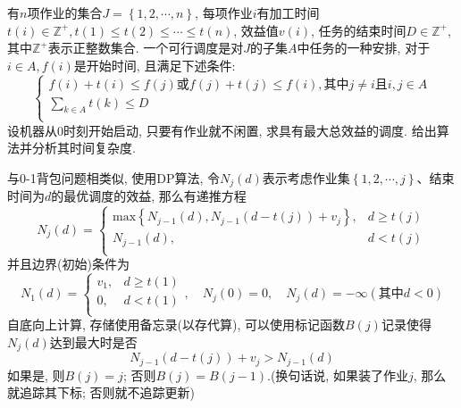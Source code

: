 \documentclass{article}
\begin{document}
\begin{homeworkProblem}
	有$n$项作业的集合$J=\left\{ 1,2,\cdots,n \right\}$, 每项作业$i$有加工时间$t(i)\in \mathbb{Z}^{+},t(1)\leq t(2)\leq \cdots \leq t(n)$, 效益值$v(i)$, 任务的结束时间$D\in \mathbb{Z}^{+}$, 其中$\mathbb{Z}^{+}$表示正整数集合. 一个可行调度是对$J$的子集$A$中任务的一种安排, 对于$i\in A,f(i)$是开始时间, 且满足下述条件:
	$$
	\begin{cases}
		f\left( i \right) +t\left( i \right) \le f\left( j \right) \text{或}f\left( j \right) +t\left( j \right) \le f\left( i \right) ,\text{其中}j\ne i\text{且}i,j\in A\\
		\displaystyle \sum_{k\in A}{t\left( k \right)}\le D\\
	\end{cases}
	$$
	设机器从0时刻开始启动, 只要有作业就不闲置, 求具有最大总效益的调度. 给出算法并分析其时间复杂度.

	\solution 与0-1背包问题相类似, 使用DP算法, 令$N_j(d)$表示考虑作业集$\left\{ 1,2,\cdots,j \right\}$、结束时间为$d$的最优调度的效益, 那么有递推方程
	$$
	N_j\left( d \right) =\begin{cases}
		\text{max} \left\{ N_{j-1}\left( d \right) ,N_{j-1}\left( d-t\left( j \right) \right) +v_j \right\} ,&		d\ge t\left( j \right)\\
		N_{j-1}\left( d \right) ,&		d<t\left( j \right)\\
	\end{cases}
	$$
	并且边界(初始)条件为
	$$
	N_1\left( d \right) =\begin{cases}
		v_1,&		d\ge t\left( 1 \right)\\
		0,&		d<t\left( 1 \right)\\
	\end{cases},\quad N_j\left( 0 \right) =0,\quad N_j\left( d \right) =-\infty \left( \text{其中}d<0 \right) 	
	$$
	自底向上计算, 存储使用备忘录(以存代算), 可以使用标记函数$B(j)$记录使得$N_j(d)$达到最大时是否
	$$
	N_{j-1}\left( d-t\left( j \right) \right) +v_j>N_{j-1}\left( d \right)
	$$
	如果是, 则$B(j)=j$; 否则$B(j)=B(j-1)$.(换句话说, 如果装了作业$j$, 那么就追踪其下标; 否则就不追踪更新) 
	

\end{homeworkProblem}
\end{document}
